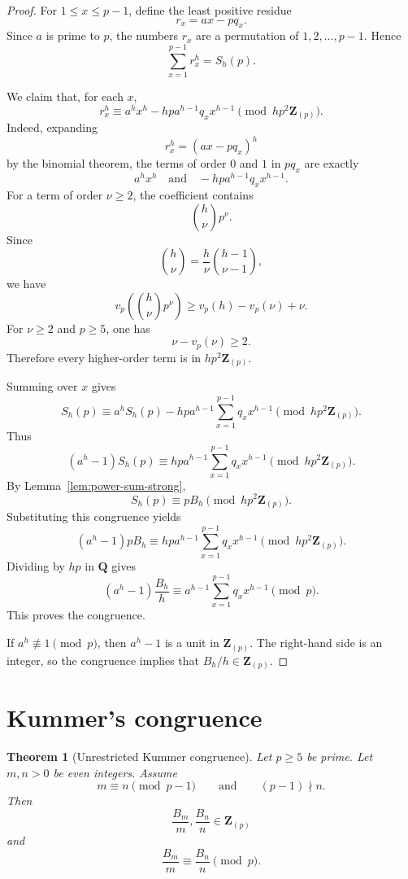 \documentclass[11pt]{article}
\newtheorem{theorem}{Theorem}[section]
\newcommand{\Z}{\mathbf Z}
\newcommand{\Q}{\mathbf Q}
\newcommand{\Bern}{B}
\begin{document}
\begin{proof}
For $1\le x\le p-1$, define the least positive residue
\[
  r_x=a x-pq_x.
\]
Since $a$ is prime to $p$, the numbers $r_x$ are a permutation of
$1,2,\dots,p-1$.  Hence
\[
  \sum_{x=1}^{p-1}r_x^h=S_h(p).
\]

We claim that, for each $x$,
\[
  r_x^h
  \equiv
  a^h x^h-hp a^{h-1}q_x x^{h-1}
  \pmod {h p^2\Z_{(p)}}.
\]
Indeed, expanding
\[
  r_x^h=(a x-pq_x)^h
\]
by the binomial theorem, the terms of order $0$ and $1$ in $pq_x$ are exactly
\[
  a^h x^h
  \quad\text{and}\quad
  -hp a^{h-1}q_x x^{h-1}.
\]
For a term of order $\nu\ge2$, the coefficient contains
\[
  {h\choose \nu}p^\nu.
\]
Since
\[
  {h\choose \nu}=\frac{h}{\nu}{h-1\choose \nu-1},
\]
we have
\[
  v_p\left({h\choose \nu}p^\nu\right)
  \ge v_p(h)-v_p(\nu)+\nu.
\]
For $\nu\ge2$ and $p\ge5$, one has
\[
  \nu-v_p(\nu)\ge2.
\]
Therefore every higher-order term is in $h p^2\Z_{(p)}$.

Summing over $x$ gives
\[
  S_h(p)
  \equiv
  a^h S_h(p)-hp a^{h-1}\sum_{x=1}^{p-1}q_xx^{h-1}
  \pmod {h p^2\Z_{(p)}}.
\]
Thus
\[
  (a^h-1)S_h(p)
  \equiv
  hp a^{h-1}\sum_{x=1}^{p-1}q_xx^{h-1}
  \pmod {h p^2\Z_{(p)}}.
\]
By Lemma~\ref{lem:power-sum-strong},
\[
  S_h(p)\equiv p\Bern_h\pmod {h p^2\Z_{(p)}}.
\]
Substituting this congruence yields
\[
  (a^h-1)p\Bern_h
  \equiv
  hp a^{h-1}\sum_{x=1}^{p-1}q_xx^{h-1}
  \pmod {h p^2\Z_{(p)}}.
\]
Dividing by $hp$ in $\Q$ gives
\[
  (a^h-1)\frac{\Bern_h}{h}
  \equiv
  a^{h-1}\sum_{x=1}^{p-1}q_xx^{h-1}
  \pmod p.
\]
This proves the congruence.

If $a^h\not\equiv1\pmod p$, then $a^h-1$ is a unit in $\Z_{(p)}$.
The right-hand side is an integer, so the congruence implies that
$\Bern_h/h\in\Z_{(p)}$.
\end{proof}

\section{Kummer's congruence}

\begin{theorem}[Unrestricted Kummer congruence]\label{thm:kummer-proof}
Let $p\ge5$ be prime.  Let $m,n>0$ be even integers.  Assume
\[
  m\equiv n\pmod {p-1}
  \qquad\text{and}\qquad
  (p-1)\nmid n.
\]
Then
\[
  \frac{\Bern_m}{m},\frac{\Bern_n}{n}\in\Z_{(p)}
\]
and
\[
  \frac{\Bern_m}{m}\equiv\frac{\Bern_n}{n}\pmod p.
\]
\end{theorem}
\end{document}
